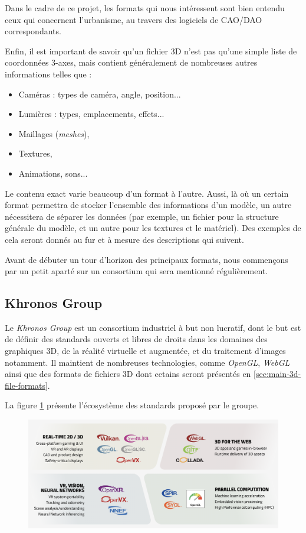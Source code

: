 Dans le cadre de ce projet, les formats qui nous intéressent sont bien entendu ceux qui concernent l'urbanisme, au travers des logiciels de CAO/DAO correspondants.

Enfin, il est important de savoir qu'un fichier 3D n'est pas qu'une simple liste de coordonnées 3-axes, mais contient généralement de nombreuses autres informations telles que : 
\begin{itemize}
    \item Caméras : types de caméra, angle, position...
    \item Lumières : types, emplacements, effets...
    \item Maillages (\textit{meshes}),
    \item Textures,
    \item Animations, sons...
\end{itemize}

Le contenu exact varie beaucoup d'un format à l'autre. Aussi, là où un certain format permettra de stocker l'ensemble des informations d'un modèle, un autre nécessitera de séparer les données (par exemple, un fichier pour la structure générale du modèle, et un autre pour les textures et le matériel). Des exemples de cela seront donnés au fur et à mesure des descriptions qui suivent.

Avant de débuter un tour d'horizon des principaux formats, nous commençons par un petit aparté sur un consortium qui sera mentionné régulièrement.

\subsection{Khronos Group}
\label{sec:khronos-group}
Le \textit{Khronos Group} est un consortium industriel à but non lucratif, dont le but est de définir des standards ouverts et libres de droits dans les domaines des graphiques 3D, de la réalité virtuelle et augmentée, et du traitement d'images notamment. Il maintient de nombreuses technologies, comme \textit{OpenGL}, \textit{WebGL} ainsi que des formats de fichiers 3D dont cetains seront présentés en \ref{sec:main-3d-file-formats}.

La figure \ref{fig:khronos-visual-computing-ecosystem} présente l'écosystème des standards proposé par le groupe.

\begin{figure}[h]
    \centering
    \includegraphics[width=0.8\linewidth]{Figures/khronos-visual-computing-ecosystem.png}
    \label{fig:khronos-visual-computing-ecosystem}
\end{figure}

